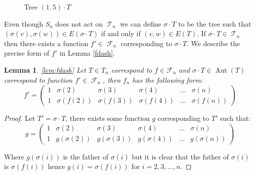 \documentclass[oneside]{book} %
\newtheorem{lem}[thm]{Lemma}
\theoremstyle{definition}
\numberwithin{equation}{section}
\DeclareMathOperator{\Aut}{Aut} %
\DeclareMathOperator{\T}{\mathcal{T}}
\DeclareMathOperator{\F}{\mathcal{F}}
\begin{document}
\begin{figure}[ht]
\centering
{}
\caption{Tree $(1,5) \cdot T$}\label{fig3}
\end{figure}

Even though $S_n$ does not act on $\T_n$ we can define $\sigma \cdot T$ to be the tree such that $(\sigma(v),\sigma(w)) \in E(\sigma \cdot T)$ if and only if $(v,w) \in E(T)$.  If $\sigma \cdot T \in \T_n$ then there exists a function $f' \in \F_n$ corresponding to $\sigma \cdot T$.  We describe the precise form of $f'$ in Lemma \ref{fdash}. 

\begin{lem}\ref{lem:fdash}
Let $T \in T_n$ correspond to $f \in \mathcal{F}_n$ and  $\sigma \cdot T \in \Aut(T)$ correspond to function $f' \in \F_n$, then $f_n$ has the following form:  
\[ f'= \left(\begin{array}{cccccc}
     1& \sigma(2)&\sigma(3) &\sigma(4)& \dots & \sigma(n) \\
     1 & \sigma(f(2)) &\sigma(f(3)) &\sigma(f(4)) &\dots & \sigma(f(n))
    \end{array} \right)
\]
\end{lem}

\begin{proof}
 Let $T' = \sigma \cdot T$, there exists some function $g$ corresponding to $T'$ such that:
 \[ g= \left(\begin{array}{cccccc}
     1& \sigma(2)&\sigma(3) &\sigma(4)& \dots & \sigma(n) \\
     1 & g(\sigma(2)) &g(\sigma(3)) &g(\sigma(4)) &\dots & g(\sigma(n))
    \end{array} \right)
\]

Where $g(\sigma(i))$ is the father of $\sigma(i)$ but it is clear that the father of $\sigma(i)$ is $\sigma(f(i))$  hence $g(i) = \sigma(f(i))$ for $i = 2,3,\dots,n$.  
\end{proof}
\end{document}
